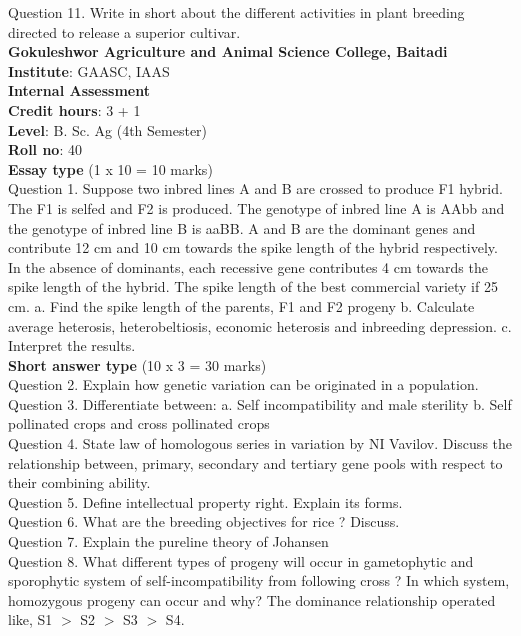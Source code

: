 \documentclass[12pt]{article}\usepackage[]{graphicx}\usepackage[]{color}
\begin{document}
Question 11. Write in short about the different activities in plant breeding directed to release a superior cultivar.\\
\clearpage 
{\centering \Large{\textbf{Gokuleshwor Agriculture and Animal Science College, Baitadi}} \\[0.25cm]
            \textbf{Institute}: GAASC, IAAS \\[0.2cm]
            \textbf{Internal Assessment} \\[0.2cm]} 
\textbf{Credit hours}: 3 + 1 \\ 
\textbf{Level}: B. Sc. Ag (4th Semester) \\
\textbf{Roll no}: 40 \\[0.5cm] 
\textbf{Essay type} (1 x 10 = 10 marks) \\
Question 1. Suppose two inbred lines A and B are crossed to produce F1 hybrid. The F1 is selfed and F2 is produced. The genotype of inbred line A is AAbb and the genotype of inbred line B is aaBB. A and B are the dominant genes and contribute 12 cm and 10 cm towards the spike length of the hybrid respectively. In the absence of dominants, each recessive gene contributes 4 cm towards the spike length of the hybrid. The spike length of the best commercial variety if 25 cm. a. Find the spike length of the parents, F1 and F2 progeny b. Calculate average heterosis, heterobeltiosis, economic heterosis and inbreeding depression. c. Interpret the results.\\
\textbf{Short answer type} (10 x 3 = 30 marks) \\
Question 2. Explain how genetic variation can be originated in a population.\\
Question 3. Differentiate between: a. Self incompatibility and male sterility b. Self pollinated crops and cross pollinated crops\\
Question 4. State law of homologous series in variation by NI Vavilov. Discuss the relationship between, primary, secondary and tertiary gene pools with respect to their combining ability.\\
Question 5. Define intellectual property right. Explain its forms.\\
Question 6. What are the breeding objectives for rice ? Discuss.\\
Question 7. Explain the pureline theory of Johansen\\
Question 8. What different types of progeny will occur in gametophytic and sporophytic system of self-incompatibility from following cross ? In which system, homozygous progeny can occur and why? The dominance relationship operated like, S1 $>$ S2 $>$ S3 $>$ S4.\\ 
\end{document}
